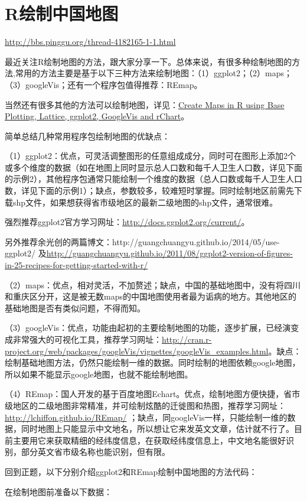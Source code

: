 \section{R绘制中国地图}

\href{http://bbs.pinggu.org/thread-4182165-1-1.html}{http://bbs.pinggu.org/thread-4182165-1-1.html}

最近关注R绘制地图的方法，跟大家分享一下。总体来说，有很多种绘制地图的方法,常用的方法主要是基于以下三种方法来绘制地图：（1）ggplot2；（2）maps；（3）googleVis；还有一个程序包值得推荐：REmap。

当然还有很多其他的方法可以绘制地图，详见：\href{https://rstudio-pubs-static.s3.amazonaws.com/79029_b56eaffe36ef44f29b8efc0a07d67208.html}{Create Maps in R using Base Plotting, Lattice, ggplot2, GoogleVis and rChart}。

简单总结几种常用程序包绘制地图的优缺点：

（1）ggplot2：优点，可灵活调整图形的任意组成成分，同时可在图形上添加2个或多个维度的数据（如在地图上同时显示总人口数和每千人卫生人口数，详见下面的示例2），其他程序包通常只能绘制一个维度的数据（总人口数或每千人卫生人口数，详见下面的示例1）；缺点，参数较多，较难短时掌握。同时绘制地区前需先下载shp文件，如果想获得省市级地区的最新二级地图的shp文件，通常很难。

强烈推荐ggplot2官方学习网址：\href{http://docs.ggplot2.org/current/}{http://docs.ggplot2.org/current/}。

另外推荐余光创的两篇博文：http://guangchuangyu.github.io/2014/05/use-ggplot2/ 及\href{http://guangchuangyu.github.io/2011/08/ggplot2-version-of-figures-in-25-recipes-for-getting-started-with-r/}{http://guangchuangyu.github.io/2011/08/ggplot2-version-of-figures-in-25-recipes-for-getting-started-with-r/}

（2）maps：优点，相对灵活，不加赘述；缺点，中国的基础地图中，没有将四川和重庆区分开，这是被无数maps的中国地图使用者最为诟病的地方。其他地区的基础地图是否有类似问题，不得而知。

（3）googleVis：优点，功能由起初的主要绘制地图的功能，逐步扩展，已经演变成非常强大的可视化工具，推荐学习网址：\href{http://cran.r-project.org/web/packages/googleVis/vignettes/googleVis\_examples.html}{http://cran.r-project.org/web/packages/googleVis/vignettes/googleVis\_examples.html}。缺点：绘制基础地图方法，仍然只能绘制一维的数据。同时绘制的地图依赖google地图，所以如果不能显示google地图，也就不能绘制地图。

（4）REmap：国人开发的基于百度地图Echart。优点，绘制地图方便快捷，省市级地区的二级地图非常精准，并可绘制炫酷的迁徙图和热图，推荐学习网址：\href{http://lchiffon.github.io/REmap/}{http://lchiffon.github.io/REmap/} ；缺点，同googleVis一样，只能绘制一维的数据，同时地图上只能显示中文地名，所以想让它来发英文文章，估计就不行了。目前主要用它来获取精细的经纬度信息，在获取经纬度信息上，中文地名能很好识别，部分英文省市级名称也能识别，但有限。

回到正题，以下分别介绍ggplot2和REmap绘制中国地图的方法代码：

在绘制地图前准备以下数据：